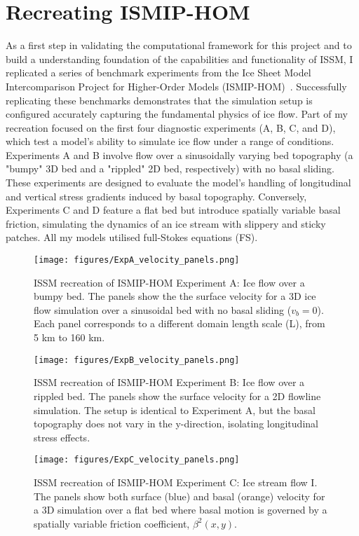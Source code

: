 \section{Recreating ISMIP-HOM}
As a first step in validating the computational framework for this project and to build a understanding foundation of the capabilities and functionality of ISSM, I replicated a series of benchmark experiments from the Ice Sheet Model Intercomparison Project for Higher-Order Models (ISMIP-HOM)~\cite{Pattyn_2008}. Successfully replicating these benchmarks demonstrates that the simulation setup is configured accurately capturing the fundamental physics of ice flow.
Part of my recreation focused on the first four diagnostic experiments (A, B, C, and D), which test a model's ability to simulate ice flow under a range of conditions. Experiments A and B involve flow over a sinusoidally varying bed topography (a "bumpy" 3D bed and a "rippled" 2D bed, respectively) with no basal sliding. These experiments are designed to evaluate the model's handling of longitudinal and vertical stress gradients induced by basal topography. Conversely, Experiments C and D feature a flat bed but introduce spatially variable basal friction, simulating the dynamics of an ice stream with slippery and sticky patches. All my models utilised full-Stokes equations (FS).
\begin{figure}[H]
    \texttt{[image: figures/ExpA\_velocity\_panels.png]}
    \caption{ISSM recreation of ISMIP-HOM Experiment A: Ice flow over a bumpy bed. The panels show the the surface velocity for a 3D ice flow simulation over a sinusoidal bed with no basal sliding ($v_b=0$). Each panel corresponds to a different domain length scale (L), from 5 km to 160 km.}
    \label{fig:4.1}
\end{figure}
\begin{figure}[H]
    \texttt{[image: figures/ExpB\_velocity\_panels.png]}
    \caption{ISSM recreation of ISMIP-HOM Experiment B: Ice flow over a rippled bed. The panels show the surface velocity for a 2D flowline simulation. The setup is identical to Experiment A, but the basal topography does not vary in the y-direction, isolating longitudinal stress effects.}
    \label{fig:4.2}
\end{figure}
\begin{figure}[H]
    \texttt{[image: figures/ExpC\_velocity\_panels.png]}
    \caption{ISSM recreation of ISMIP-HOM Experiment C: Ice stream flow I. The panels show both surface (blue) and basal (orange) velocity for a 3D simulation over a flat bed where basal motion is governed by a spatially variable friction coefficient, $\beta^{2}(x,y)$.}
    \label{fig:4.3}
\end{figure}
